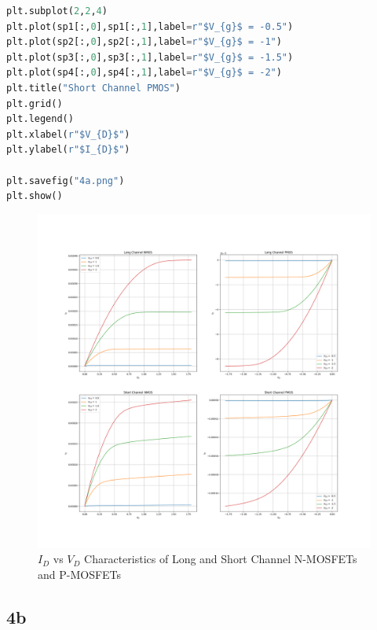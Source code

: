 \documentclass{article}
\begin{document}
\begin{lstlisting}[language=Python]
plt.subplot(2,2,4)
plt.plot(sp1[:,0],sp1[:,1],label=r"$V_{g}$ = -0.5")
plt.plot(sp2[:,0],sp2[:,1],label=r"$V_{g}$ = -1")
plt.plot(sp3[:,0],sp3[:,1],label=r"$V_{g}$ = -1.5")
plt.plot(sp4[:,0],sp4[:,1],label=r"$V_{g}$ = -2")
plt.title("Short Channel PMOS")
plt.grid()
plt.legend()
plt.xlabel(r"$V_{D}$")
plt.ylabel(r"$I_{D}$")

plt.savefig("4a.png")
plt.show()
\end{lstlisting}

\begin{figure}[!ht]
    \centering
    \includegraphics[scale=0.35]{Images/4a.png}
    \caption{$I_D$ vs $V_D$ Characteristics of Long and Short Channel N-MOSFETs and P-MOSFETs}
\end{figure}
\subsection{4b}
\end{document}
